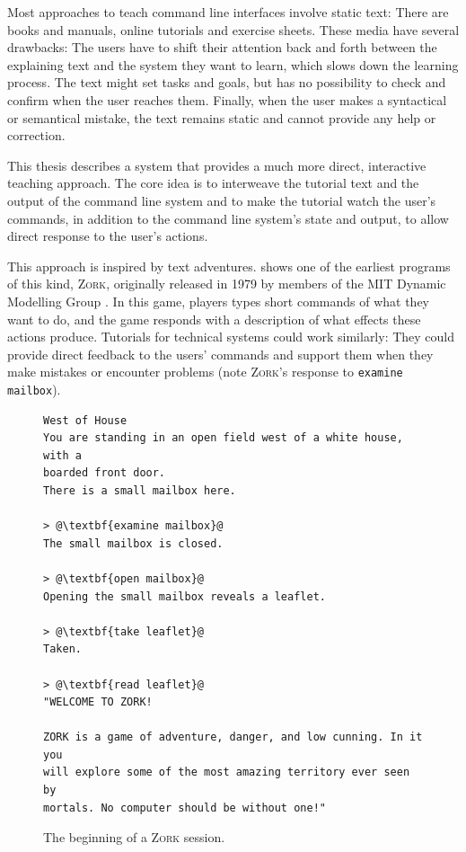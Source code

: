\documentclass[paper=a4,twoside,abstract=on,cleardoublepage=empty,numbers=noenddot,toc=bib,toc=listof,12pt,appendixprefix=true]{scrreprt}
\begin{document}
Most approaches to teach command line interfaces involve static text: There are books and manuals, online tutorials and exercise sheets. These media have several drawbacks: The users have to shift their attention back and forth between the explaining text and the system they want to learn, which slows down the learning process. The text might set tasks and goals, but has no possibility to check and confirm when the user reaches them. Finally, when the user makes a syntactical or semantical mistake, the text remains static and cannot provide any help or correction.

This thesis describes a system that provides a much more direct, interactive teaching approach. The core idea is to interweave the tutorial text and the output of the command line system and to make the tutorial watch the user's commands, in addition to the command line system's state and output, to allow direct response to the user's actions.

This approach is inspired by text adventures.  shows one of the earliest programs of this kind, \textsc{Zork}, originally released in 1979 by members of the MIT Dynamic Modelling Group \cite{infocom}. In this game, players types short commands of what they want to do, and the game responds with a description of what effects these actions produce. Tutorials for technical systems could work similarly: They could provide direct feedback to the users' commands and support them when they make mistakes or encounter problems (note \textsc{Zork}'s response to \texttt{examine mailbox}).

\begin{figure}[tb]
    \begin{lstlisting}[escapechar=@,frame=shadowbox]
West of House
You are standing in an open field west of a white house, with a
boarded front door.
There is a small mailbox here.

> @\textbf{examine mailbox}@
The small mailbox is closed.

> @\textbf{open mailbox}@
Opening the small mailbox reveals a leaflet.

> @\textbf{take leaflet}@
Taken.

> @\textbf{read leaflet}@
"WELCOME TO ZORK!

ZORK is a game of adventure, danger, and low cunning. In it you
will explore some of the most amazing territory ever seen by
mortals. No computer should be without one!"
    \end{lstlisting}
    \centering
    \caption{The beginning of a \textsc{Zork} session.}
    \label{fig:zork}
\end{figure}
\end{document}
